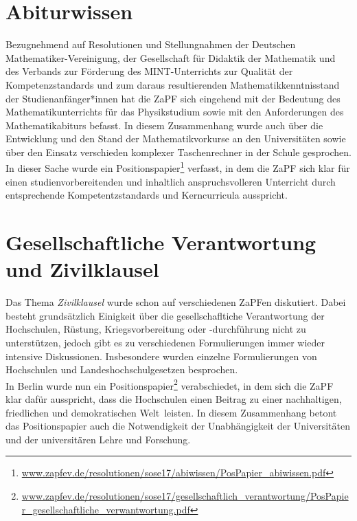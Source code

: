 \documentclass[a4paper]{article}
\begin{document}
\section*{Abiturwissen}
Bezugnehmend auf Resolutionen und Stellungnahmen der Deutschen Mathematiker-Vereinigung, der Gesellschaft für Didaktik der Mathematik und des Verbands zur Förderung des MINT-Unterrichts zur Qualität der Kompetenzstandards und zum daraus resultierenden Mathematikkenntnisstand der Studienanfänger*innen hat die ZaPF sich eingehend mit der Bedeutung des Mathematikunterrichts für das Physikstudium sowie mit den Anforderungen des Mathematikabiturs befasst. In diesem Zusammenhang wurde auch über die Entwicklung und den Stand der Mathematikvorkurse an den Universitäten sowie über den Einsatz verschieden komplexer Taschenrechner in der Schule gesprochen. In dieser Sache wurde ein Positionspapier\footnote{\href{https://zapfev.de/resolutionen/sose17/abiwissen/PosPapier_abiwissen.pdf}{\url{www.zapfev.de/resolutionen/sose17/abiwissen/PosPapier_abiwissen.pdf}}}
verfasst, in dem die ZaPF sich klar für einen studienvorbereitenden und inhaltlich anspruchsvolleren Unterricht durch entsprechende Kompetentzstandards und Kerncurricula ausspricht.


\section*{Gesellschaftliche Verantwortung und Zivilklausel} 
Das Thema \emph{Zivilklausel} wurde schon auf verschiedenen ZaPFen diskutiert. 
Dabei besteht grundsätzlich Einigkeit über die gesellschafltiche Verantwortung der Hochschulen, Rüstung, Kriegsvorbereitung oder -durchführung nicht zu unterstützen, jedoch gibt es zu verschiedenen Formulierungen immer wieder intensive Diskussionen. Insbesondere wurden einzelne Formulierungen von Hochschulen und Landeshochschulgesetzen besprochen.\\
 In Berlin wurde nun ein Positionspapier\footnote{\href{https://zapfev.de/resolutionen/sose17/gesellschaftlich_verantwortung/PosPapier_gesellschaftliche_verwantwortung.pdf} {\url{www.zapfev.de/resolutionen/sose17/gesellschaftlich_verantwortung/PosPapier_gesellschaftliche_verwantwortung.pdf}}} 
verabschiedet, in dem sich die ZaPF klar dafür ausspricht, \glqq dass die Hochschulen einen Beitrag zu einer nachhaltigen, friedlichen und demokratischen Welt\grqq~leisten. In diesem Zusammenhang betont das Positionspapier auch die Notwendigkeit der Unabhängigkeit der Universitäten und der universitären Lehre und Forschung.
\end{document}
